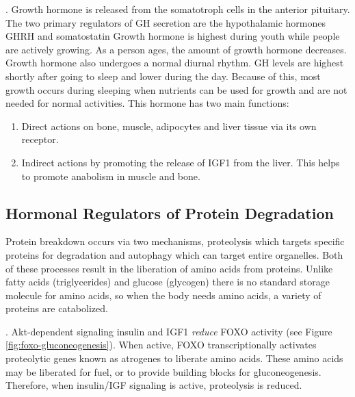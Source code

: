 \documentclass{tufte-handout}
\begin{document}
.  Growth hormone is released from the somatotroph cells in the anterior pituitary.  The two primary regulators of GH secretion are the hypothalamic hormones GHRH and somatostatin  Growth hormone is highest during youth while people are actively growing.  As a person ages, the amount of growth hormone decreases.  Growth hormone also undergoes a normal diurnal rhythm.  GH levels are highest shortly after going to sleep and lower during the day.  Because of this, most growth occurs during sleeping when nutrients can be used for growth and are not needed for normal activities.  This hormone has two main functions:
\begin{enumerate}
\item Direct actions on bone, muscle, adipocytes and liver tissue via its own receptor.
\item Indirect actions by promoting the release of IGF1 from the liver.  This helps to promote anabolism in muscle and bone.
\end{enumerate}

\subsection{Hormonal Regulators of Protein Degradation}
Protein breakdown occurs via two mechanisms, proteolysis which targets specific proteins for degradation and autophagy which can target entire organelles.  Both of these processes result in the liberation of amino acids from proteins.  Unlike fatty acids (triglycerides) and glucose (glycogen) there is no standard storage molecule for amino acids, so when the body needs amino acids, a variety of proteins are catabolized. 

.  Akt-dependent signaling insulin and IGF1 \emph{reduce} FOXO activity (see Figure \ref{fig:foxo-gluconeogenesis}).  When active, FOXO transcriptionally activates proteolytic genes known as atrogenes to liberate amino acids.  These amino acids may be liberated for fuel, or to provide building blocks for gluconeogenesis.  Therefore, when insulin/IGF signaling is active, proteolysis is reduced. 
\end{document}
